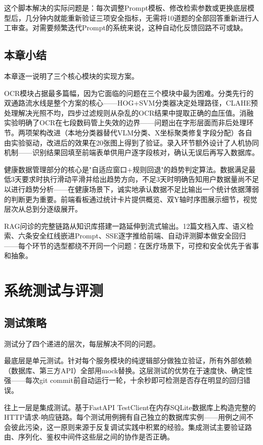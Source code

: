\documentclass[zihao=-4,a4paper]{ctexart}
\begin{document}
这个脚本解决的实际问题是：每次调整Prompt模板、修改检索参数或更换底层模型后，几分钟内就能重新验证三项安全指标，无需将10道题的全部回答重新进行人工审查。对需要频繁迭代Prompt的系统来说，这种自动化反馈回路不可或缺。

\subsection{本章小结}

本章逐一说明了三个核心模块的实现方案。

OCR模块占据最多篇幅，因为它面临的问题在三个模块中最为困难。分类先行的双通路流水线是整个方案的核心——HOG+SVM分类器决定处理路径，CLAHE预处理解决光照不均，四步过滤规则从杂乱的OCR结果中提取正确的血压值。消融实验明确了OCR在七段数码管上失效的边界——问题出在字形层面而非后处理环节。两项架构改进（本地分类器替代VLM分类、X坐标聚类修复字段分配）各自由实验驱动，改进后的效果在20张图上得到了验证。录入环节额外设计了人机协同机制——识别结果回填至前端表单供用户逐字段核对，确认无误后再写入数据库。

健康数据管理部分的核心是"自适应窗口+规则回退"的趋势判定算法。数据满足最低3天要求时执行滑动平滑并给出趋势方向，不足3天时明确告知用户数据量尚不足以进行趋势分析——在健康场景下，诚实地承认数据不足比输出一个统计依据薄弱的判断更为重要。前端看板通过统计卡片提供概览、双Y轴时序图展示细节，视觉层次从总到分逐级展开。

RAG问诊的完整链路从知识库搭建一路延伸到流式输出。12篇文档入库、语义检索、六条安全红线嵌进Prompt、SSE逐字推给前端、自动评测脚本做安全回归——每个环节的选型都绕不开同一个问题：在医疗场景下，可控和安全优先于省事和抽象。

\newpage
\section{系统测试与评测}

\subsection{测试策略}

测试分了四个递进的层次，每层解决不同的问题。

最底层是单元测试。针对每个服务模块的纯逻辑部分做独立验证，所有外部依赖（数据库、第三方API）全部用mock替换。这层测试的优势在于速度快、确定性强——每次git commit前自动运行一轮，十余秒即可检测是否存在明显的回归错误。

往上一层是集成测试。基于FastAPI TestClient在内存SQLite数据库上构造完整的HTTP请求-响应链路。每个测试用例拥有自己独立的数据库实例——用例之间不会彼此污染，这一原则来源于反复调试实践中积累的经验。集成测试主要验证路由、序列化、鉴权中间件这些层之间的协作是否正确。
\end{document}
